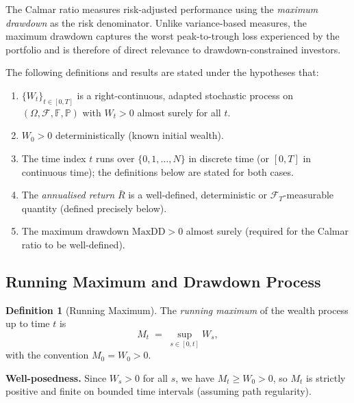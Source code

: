 \documentclass[12pt,openany]{book}
\newcommand{\MaxDD}{\mathrm{MaxDD}}
\numberwithin{equation}{chapter}
\theoremstyle{plain}
\theoremstyle{definition}
\newtheorem{definition}[theorem]{Definition}
\theoremstyle{remark}
\numberwithin{equation}{chapter}
\theoremstyle{plain}
\begin{document}
\noindent
The Calmar ratio measures risk-adjusted performance using the
\emph{maximum drawdown} as the risk denominator.  Unlike
variance-based measures, the maximum drawdown captures the
worst peak-to-trough loss experienced by the portfolio and is
therefore of direct relevance to drawdown-constrained
investors.

\noindent
The following definitions and results are stated under the
hypotheses that:
\begin{enumerate}
  \item $\{W_t\}_{t \in [0,T]}$ is a right-continuous,
        adapted stochastic process on
        $(\Omega,\mathcal{F},\mathbb{F},\mathbb{P})$
        with $W_t > 0$ almost surely for all $t$.
  \item $W_0 > 0$ deterministically (known initial wealth).
  \item The time index $t$ runs over $\{0,1,\ldots,N\}$
        in discrete time (or $[0,T]$ in continuous time);
        the definitions below are stated for both cases.
  \item The \emph{annualised return} $\bar{R}$ is a
        well-defined, deterministic or
        $\mathcal{F}_T$-measurable quantity (defined
        precisely below).
  \item The maximum drawdown $\MaxDD > 0$ almost surely
        (required for the Calmar ratio to be well-defined).
\end{enumerate}

\subsection{Running Maximum and Drawdown Process}

\begin{definition}[Running Maximum]
\label{def:running-max}
The \emph{running maximum} of the wealth process up to
time $t$ is
\begin{equation}
  M_t \;=\; \sup_{s \in [0,t]} W_s,
  \label{eq:running-max}
\end{equation}
with the convention $M_0 = W_0 > 0$.

\noindent
\textbf{Well-posedness.}
Since $W_s > 0$ for all $s$, we have $M_t \geq W_0 > 0$,
so $M_t$ is strictly positive and finite on bounded
time intervals (assuming path regularity).
\end{definition}
\end{document}
